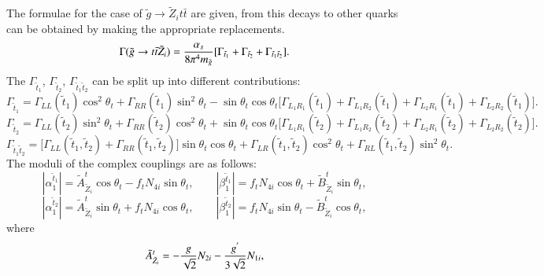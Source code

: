 \documentclass[final,3p,times]{elsarticle}
\begin{document}
The formulae for the case of $\tilde{g} \rightarrow \tilde{Z}_i t \bar{t}$ are given, from this decays to other quarks can be obtained by making the appropriate replacements.
\begin{equation} \label{gttneut}
\Gamma(\tilde{g} \rightarrow t \bar{t} \tilde{Z}_i) = {\alpha_s \over 8\pi^4 m_{\tilde{g}}}[\Gamma_{\tilde{t}_1} + \Gamma_{\tilde{t}_2} + \Gamma_{\tilde{t}_{1} \tilde{t}_{2}}].
\end{equation}
The $\Gamma_{\tilde{t}_1}$, $\Gamma_{\tilde{t}_2}$, $\Gamma_{\tilde{t}_1 \tilde{t}_2}$ can be split up into different contributions:
\begin{equation}
\Gamma_{\tilde{t}_1} = \Gamma_{LL}(\tilde{t}_1)\cos^2 \theta_t + \Gamma_{RR}(\tilde{t}_1)\sin^2 \theta_t - \sin\theta_t \cos \theta_t \Big[\Gamma_{L_{1} R_{1}} (\tilde{t}_1) + \Gamma_{L_{1} R_{2}} (\tilde{t}_1) + \Gamma_{L_{2} R_{1}} (\tilde{t}_1) + \Gamma_{L_{2} R_{2}} (\tilde{t}_1)\Big].
\end{equation}
\begin{equation}
\Gamma_{\tilde{t}_2} = \Gamma_{LL}(\tilde{t}_2)\sin^2 \theta_t + \Gamma_{RR}(\tilde{t}_2)\cos^2 \theta_t + \sin\theta_t \cos \theta_t \Big[\Gamma_{L_{1} R_{1}} (\tilde{t}_2) + \Gamma_{L_{1} R_{2}} (\tilde{t}_2) + \Gamma_{L_{2} R_{1}} (\tilde{t}_2) + \Gamma_{L_{2} R_{2}} (\tilde{t}_2)\Big].
\end{equation}
\begin{equation}
\Gamma_{\tilde{t}_{1} \tilde{t}_{2}} = \Big[\Gamma_{LL}(\tilde{t}_{1}, \tilde{t}_{2}) + \Gamma_{RR}(\tilde{t}_{1}, \tilde{t}_{2})\Big]\sin\theta_t \cos\theta_t + \Gamma_{LR}(\tilde{t}_1 , \tilde{t}_2) \cos^2 \theta_t + \Gamma_{RL}(\tilde{t}_1 , \tilde{t}_2) \sin^2 \theta_t.
\end{equation}
The moduli of the complex couplings are as follows:
\begin{equation}
|\alpha_{1}^{\tilde{t}_1}| = \tilde{A}^{t}_{\tilde{Z}_{i}} \cos\theta_t - f_{t}N_{4i} \sin\theta_t, \quad \quad |\beta_{1}^{\tilde{t}_1}| = f_{t}N_{4i}\cos\theta_t + \tilde{B}^{t}_{\tilde{Z}_{i}}\sin\theta_t,
\end{equation}
\begin{equation}
|\alpha_{1}^{\tilde{t}_2}| = \tilde{A}^{t}_{\tilde{Z}_i} \sin\theta_t + f_{t}N_{4i}\cos\theta_t, \quad \quad |\beta_{1}^{\tilde{t}_2}| = f_{t}N_{4i}\sin\theta_t - \tilde{B}^{t}_{\tilde{Z}_i}\cos\theta_t,
\end{equation}
where
\begin{equation} 
\tilde{A}^{t}_{\tilde{Z}_i} = -{g \over \sqrt{2}}N_{2i} - {g^{'} \over 3 \sqrt{2}}N_{1i},
\end{equation}
\end{document}
